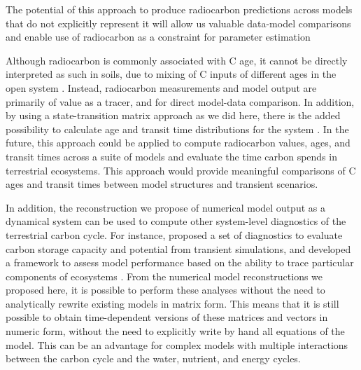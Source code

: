 \documentclass[draft]{agujournal2019}
\begin{document}

The potential of this approach to produce radiocarbon predictions across models that do not explicitly represent it will allow us valuable data-model comparisons and enable use of radiocarbon as a constraint for parameter estimation \cite{He2016}

Although radiocarbon is commonly associated with C age, it cannot be directly interpreted as such in soils, due to mixing of C inputs of different ages in the open system \cite{Trumbore2016}. Instead, radiocarbon measurements and model output are primarily of value as a tracer, and for direct model-data comparison. In addition, by using a state-transition matrix approach as we did here, there is the added possibility to calculate age and transit time distributions for the system \cite{Metzler2018PNAS}. In the future, this approach could be applied to compute radiocarbon values, ages, and transit times across a suite of models and evaluate the time carbon spends in terrestrial ecosystems. This approach would provide meaningful comparisons of C ages and transit times between model structures and transient scenarios. 

In addition, the reconstruction we propose of numerical model output as a dynamical system can be used to compute other system-level diagnostics of the terrestrial carbon cycle. For instance,  proposed a set of diagnostics to evaluate carbon storage capacity and potential from transient simulations, and developed a framework to assess model performance based on the ability to trace particular components of ecosystems \cite{Xia2013, Luo2015}. From the numerical model reconstructions we proposed here, it is possible to perform these analyses without the need to analytically rewrite existing models in matrix form. This means that it is still possible to obtain time-dependent versions of these matrices and vectors in numeric form, without the need to explicitly write by hand all equations of the model. This can be an advantage for complex models with multiple interactions between the carbon cycle and the water, nutrient, and energy cycles. 
\end{document}
